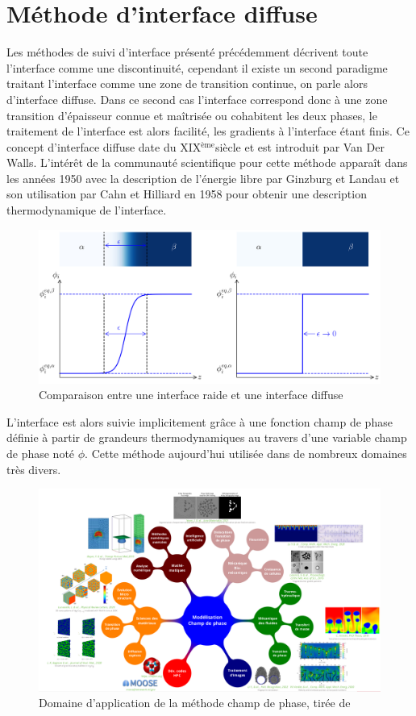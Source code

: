 







\section{Méthode d'interface diffuse}
Les méthodes de suivi d'interface présenté précédemment décrivent toute l'interface comme une discontinuité, cependant il existe un second paradigme traitant l'interface comme une zone de transition continue, on parle alors d'interface diffuse.
Dans ce second cas l'interface correspond donc à une zone transition d'épaisseur connue et maîtrisée ou cohabitent les deux phases, le traitement de l'interface est alors facilité, les gradients à l'interface étant finis. Ce concept d'interface diffuse date du XIX$^{\text{ème}}$siècle et est introduit par Van Der Walls. L'intérêt de la communauté scientifique pour cette méthode apparaît dans les années 1950 avec la description de l'énergie libre par Ginzburg et Landau et son utilisation par Cahn et Hilliard en 1958 \cite{cahn_free_1958} pour obtenir une description thermodynamique de l'interface.
\begin{figure}[H]
	\centering
	\includegraphics[width=0.7\linewidth]{figure/diffuse_interface}
	\caption{Comparaison entre une interface raide et une interface diffuse}
	\label{fig:diffuseinterface}
\end{figure} 
\noindent L'interface est alors suivie implicitement grâce à une fonction champ de phase définie à partir de grandeurs thermodynamiques au travers d'une variable champ de phase noté $\phi$. Cette méthode aujourd'hui utilisée dans de nombreux domaines très divers.
\begin{figure}[H]
	\centering
	\includegraphics[width=0.9\linewidth]{figure/champ_phase}
	\caption[Domaine d'application de la méthode champ de phase]{Domaine d'application de la méthode champ de phase, tirée de \cite{introini_suivi_nodate}}
	\label{fig:champphase}
\end{figure} 

